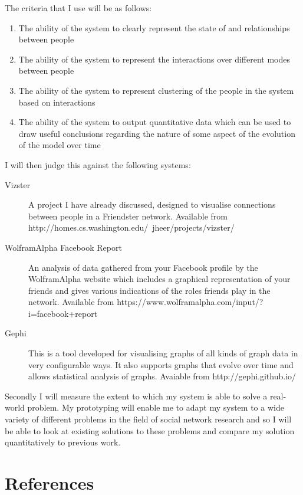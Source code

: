 \documentclass[12pt,a4paper]{article}
\begin{document}
The criteria that I use will be as follows:
\begin{enumerate}
\item The ability of the system to clearly represent the state of and relationships between people
\item The ability of the system to represent the interactions over different modes between people
\item The ability of the system to represent clustering of the people in the system based on interactions
\item The ability of the system to output quantitative data which can be used to draw useful conclusions regarding the nature of some aspect of the evolution of the model over time
\end{enumerate}

I will then judge this against the following systems:
\begin{description}
\item[Vizster] A project I have already discussed, designed to visualise connections between people in a Friendster network. Available from http://homes.cs.washington.edu/~jheer/projects/vizster/
\item[WolframAlpha Facebook Report] An analysis of data gathered from your Facebook profile by the WolframAlpha website which includes a graphical representation of your friends and gives various indications of the roles friends play in the network. Available from https://www.wolframalpha.com/input/?i=facebook+report
\item[Gephi] This is a tool developed for visualising graphs of all kinds of graph data in very configurable ways. It also supports graphs that evolve over time and allows statistical analysis of graphs. Avaiable from http://gephi.github.io/
\end{description}

Secondly I will measure the extent to which my system is able to solve a real-world problem. My prototyping will enable me to adapt my system to a wide variety of different problems in the field of social network research and so I will be able to look at existing solutions to these problems and compare my solution quantitatively to previous work.

\section{References}


\end{document}
